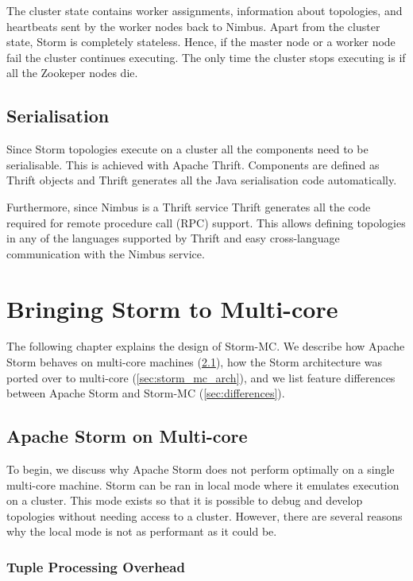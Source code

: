 \documentclass[bsc,logo,frontabs,twoside,singlespacing,normalheadings,parskip]{infthesis}\usepackage[]{graphicx}\usepackage[]{color}
\let\Oldtodo\todo
\renewcommand{\todo}[1]{\Oldtodo[inline]{#1}}
\begin{document}
The cluster state contains worker assignments, information about topologies, and heartbeats sent by the worker nodes back to Nimbus. Apart from the cluster state, Storm is completely stateless. Hence, if the master node or a worker node fail the cluster continues executing. The only time the cluster stops executing is if all the Zookeper nodes die.

\section{Serialisation}
\label{sec:serialisation}

Since Storm topologies execute on a cluster all the components need to be serialisable. This is achieved with Apache Thrift. Components are defined as Thrift objects and Thrift generates all the Java serialisation code automatically.

\todo{Why is Thrift good?}

Furthermore, since Nimbus is a Thrift service Thrift generates all the code required for remote procedure call (RPC) support. This allows defining topologies in any of the languages supported by Thrift and easy cross-language communication with the Nimbus service.
\clearpage{}

\clearpage{}\chapter{Bringing Storm to Multi-core}

The following chapter explains the design of Storm-MC. We describe how Apache Storm behaves on multi-core machines (\ref{sec:storm_on_mc}), how the Storm architecture was ported over to multi-core (\ref{sec:storm_mc_arch}), and we list feature differences between Apache Storm and Storm-MC (\ref{sec:differences}).

\section{Apache Storm on Multi-core}
\label{sec:storm_on_mc}

To begin, we discuss why Apache Storm does not perform optimally on a single multi-core machine. Storm can be ran in local mode where it emulates execution on a cluster. This mode exists so that it is possible to debug and develop topologies without needing access to a cluster. However, there are several reasons why the local mode is not as performant as it could be.

\subsection{Tuple Processing Overhead}
\end{document}
